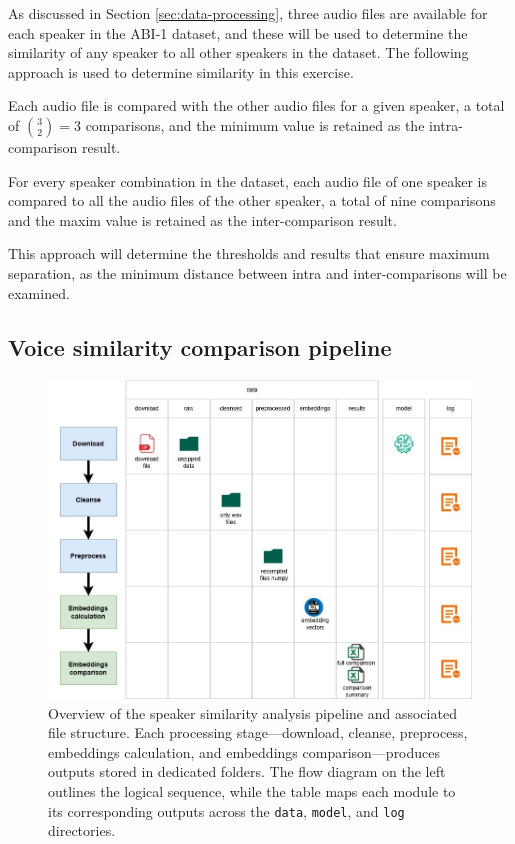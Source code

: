 \documentclass[conference]{IEEEtran}
\begin{document}
As discussed in Section \ref{sec:data-processing}, three audio files are available for each speaker in the ABI-1 dataset, and these will be used to determine the similarity of any speaker to all other speakers in the dataset. The following approach is used to determine similarity in this exercise.

Each audio file is compared with the other audio files for a given speaker, a total of $\binom{3}{2} = 3$ comparisons, and the minimum value is retained as the intra-comparison result.

For every speaker combination in the dataset, each audio file of one speaker is compared to all the audio files of the other speaker, a total of nine comparisons and the maxim value is retained as the inter-comparison result.

This approach will determine the thresholds and results that ensure maximum separation, as the minimum distance between intra and inter-comparisons will be examined.



\subsection{Voice similarity comparison pipeline}

\begin{figure}[H]
	\centering
	\includegraphics[width=1\linewidth]{img/img-pipeline}
	\caption{Overview of the speaker similarity analysis pipeline and associated file structure. Each processing stage—download, cleanse, preprocess, embeddings calculation, and embeddings comparison—produces outputs stored in dedicated folders. The flow diagram on the left outlines the logical sequence, while the table maps each module to its corresponding outputs across the \texttt{data}, \texttt{model}, and \texttt{log} directories.}
	
	\label{fig:img-pipeline}
\end{figure}
\end{document}
